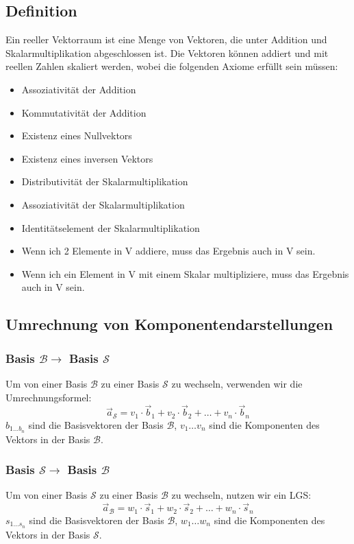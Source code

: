 \documentclass{article}
\begin{document}
\begin{minipage}[t]{0.45\textwidth}
    \subsection*{Definition}
    Ein reeller Vektorraum ist eine Menge von Vektoren, die unter Addition und Skalarmultiplikation abgeschlossen ist. 
    Die Vektoren können addiert und mit reellen Zahlen skaliert werden, wobei die folgenden Axiome erfüllt sein müssen:
    \begin{itemize}
        \item Assoziativität der Addition
        \item Kommutativität der Addition
        \item Existenz eines Nullvektors
        \item Existenz eines inversen Vektors
        \item Distributivität der Skalarmultiplikation
        \item Assoziativität der Skalarmultiplikation
        \item Identitätselement der Skalarmultiplikation
        \item Wenn ich 2 Elemente in V addiere, muss das Ergebnis auch in V sein.
        \item Wenn ich ein Element in V mit einem Skalar multipliziere, muss das Ergebnis auch in V sein.
    \end{itemize}

    \subsection*{Umrechnung von Komponentendarstellungen}
    \subsubsection*{Basis $\mathcal{B} \to$ Basis $\mathcal{S}$}
    Um von einer Basis \( \mathcal{B} \)  zu einer Basis \( \mathcal{S} \) zu wechseln, verwenden wir die Umrechnungsformel:
    \begin{equation*}
        \vec{a}_{\mathcal{S}} = v_1 \cdot \vec{b}_1 + v_2 \cdot \vec{b}_2 + \ldots + v_n \cdot \vec{b}_n
    \end{equation*}
    $b_{1 \ldots b_n}$ sind die Basisvektoren der Basis $\mathcal{B}$, $v_1 \ldots v_n$ sind die Komponenten des Vektors in der Basis $\mathcal{B}$.

    \subsubsection*{Basis $\mathcal{S} \to$ Basis $\mathcal{B}$}
    Um von einer Basis \( \mathcal{S} \) zu einer Basis \( \mathcal{B} \) zu wechseln, nutzen wir ein LGS:
    \begin{equation*}
        \vec{a}_{\mathcal{B}} = w_1 \cdot \vec{s}_1 + w_2 \cdot \vec{s}_2 + \ldots + w_n \cdot \vec{s}_n
    \end{equation*}
    $s_{1 \ldots s_n}$ sind die Basisvektoren der Basis $\mathcal{B}$, $w_1 \ldots w_n$ sind die Komponenten des Vektors in der Basis $\mathcal{S}$.

\end{minipage}
\end{document}

